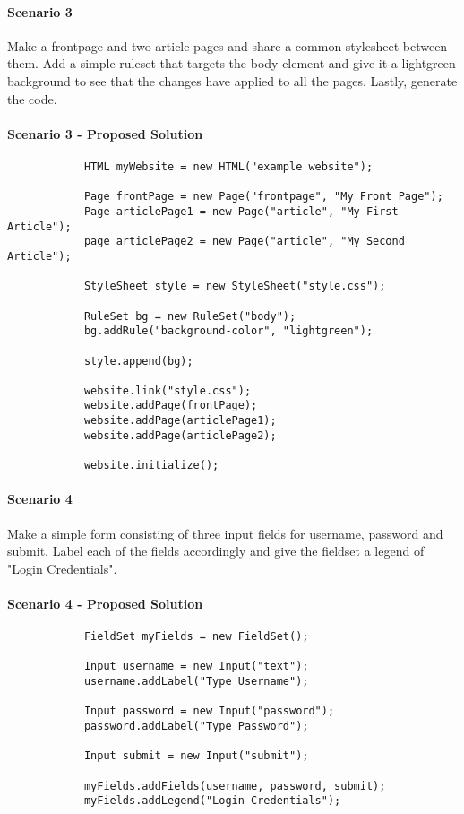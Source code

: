\documentclass[12pt]{article}
\begin{document}
        \paragraph{Scenario 3}
        Make a frontpage and two article pages and share a common stylesheet between them. Add a simple ruleset that targets the body element and give it a lightgreen background to see that the changes have applied to all the pages. Lastly, generate the code.

        \paragraph{Scenario 3 - Proposed Solution}

        \begin{lstlisting}
            HTML myWebsite = new HTML("example website");
            
            Page frontPage = new Page("frontpage", "My Front Page");
            Page articlePage1 = new Page("article", "My First Article");
            page articlePage2 = new Page("article", "My Second Article");

            StyleSheet style = new StyleSheet("style.css");

            RuleSet bg = new RuleSet("body");
            bg.addRule("background-color", "lightgreen");

            style.append(bg);

            website.link("style.css");
            website.addPage(frontPage);
            website.addPage(articlePage1);
            website.addPage(articlePage2);

            website.initialize();
        \end{lstlisting}

        \paragraph{Scenario 4}
        Make a simple form consisting of three input fields for username, password and submit. Label each of the fields accordingly and give the fieldset a legend of "Login Credentials".

        \paragraph{Scenario 4 - Proposed Solution}

        \begin{lstlisting}
            FieldSet myFields = new FieldSet();

            Input username = new Input("text");
            username.addLabel("Type Username");
            
            Input password = new Input("password");
            password.addLabel("Type Password");
            
            Input submit = new Input("submit");

            myFields.addFields(username, password, submit);
            myFields.addLegend("Login Credentials");
        \end{lstlisting}
\end{document}
